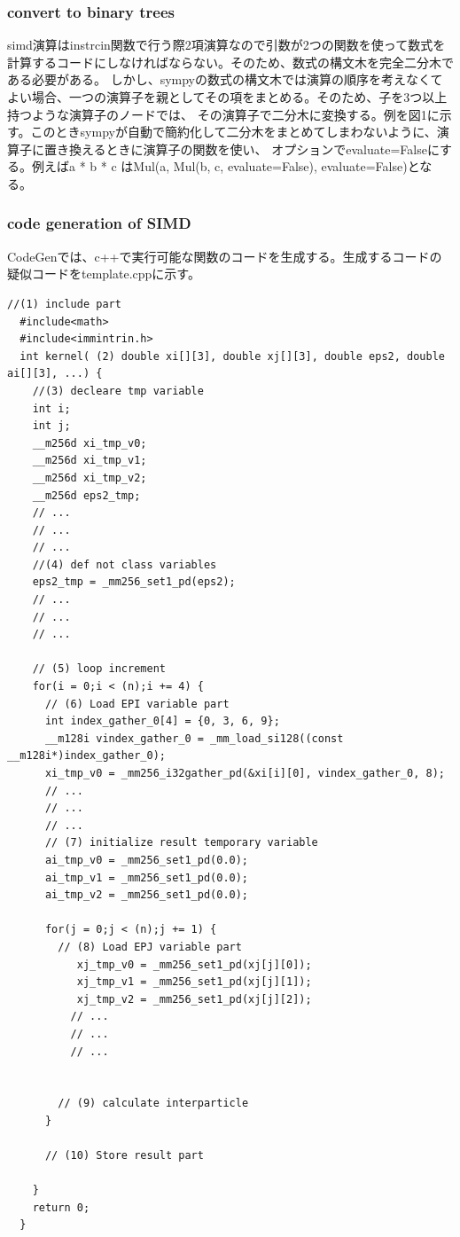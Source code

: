 \documentclass{jarticle}
\begin{document}
\subsubsection{convert to binary trees}
simd演算はinstrcin関数で行う際2項演算なので引数が2つの関数を使って数式を計算するコードにしなければならない。そのため、数式の構文木を完全二分木である必要がある。
しかし、sympyの数式の構文木では演算の順序を考えなくてよい場合、一つの演算子を親としてその項をまとめる。そのため、子を3つ以上持つような演算子のノードでは、
その演算子で二分木に変換する。例を図1に示す。このときsympyが自動で簡約化して二分木をまとめてしまわないように、演算子に置き換えるときに演算子の関数を使い、
オプションでevaluate=Falseにする。例えばa * b * c はMul(a, Mul(b, c, evaluate=False), evaluate=False)となる。



\subsubsection{code generation of SIMD}
CodeGenでは、c++で実行可能な関数のコードを生成する。生成するコードの疑似コードをtemplate.cppに示す。

\begin{lstlisting}[frame=single, caption=template.cpp]
  //(1) include part
  #include<math>
  #include<immintrin.h>
  int kernel( (2) double xi[][3], double xj[][3], double eps2, double ai[][3], ...) {
    //(3) decleare tmp variable
    int i;
    int j;
    __m256d xi_tmp_v0;
    __m256d xi_tmp_v1;  
    __m256d xi_tmp_v2;
    __m256d eps2_tmp;
    // ... 
    // ... 
    // ... 
    //(4) def not class variables
    eps2_tmp = _mm256_set1_pd(eps2);
    // ... 
    // ... 
    // ... 
    
    // (5) loop increment
    for(i = 0;i < (n);i += 4) {
      // (6) Load EPI variable part
      int index_gather_0[4] = {0, 3, 6, 9};
      __m128i vindex_gather_0 = _mm_load_si128((const __m128i*)index_gather_0);    
      xi_tmp_v0 = _mm256_i32gather_pd(&xi[i][0], vindex_gather_0, 8);
      // ... 
      // ... 
      // ... 
      // (7) initialize result temporary variable
      ai_tmp_v0 = _mm256_set1_pd(0.0);
      ai_tmp_v1 = _mm256_set1_pd(0.0);
      ai_tmp_v2 = _mm256_set1_pd(0.0);
  
      for(j = 0;j < (n);j += 1) {
        // (8) Load EPJ variable part
           xj_tmp_v0 = _mm256_set1_pd(xj[j][0]);
           xj_tmp_v1 = _mm256_set1_pd(xj[j][1]);
           xj_tmp_v2 = _mm256_set1_pd(xj[j][2]);
          // ... 
          // ... 
          // ... 
           
  
        // (9) calculate interparticle
      }
  
      // (10) Store result part
  
    }
    return 0;
  }
  \end{lstlisting}
\end{document}
